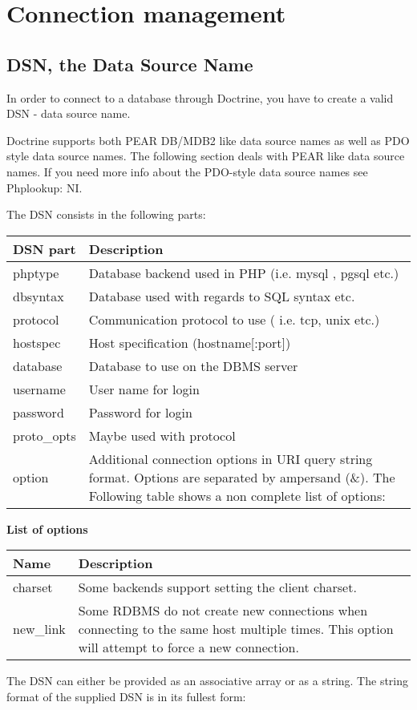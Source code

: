 \documentclass[11pt,a4paper]{report}
\begin{document}
\chapter{Connection management}
\section{DSN, the Data Source Name}
In order to connect to a database through Doctrine, you have to create a valid DSN - data source name.

Doctrine supports both PEAR DB/MDB2 like data source names as well as PDO style data source names. The following section deals with PEAR like data source names. If you need more info about the PDO-style data source names see Phplookup: NI.

The DSN consists in the following parts:

\begin{tabular}{|l|l|}
\hline
DSN part & Description\\
\hline
phptype & Database backend used in PHP (i.e. mysql , pgsql etc.)\\
\hline
dbsyntax & Database used with regards to SQL syntax etc.\\
\hline
protocol & Communication protocol to use ( i.e. tcp, unix etc.)\\
\hline
hostspec & Host specification (hostname[:port])\\
\hline
database & Database to use on the DBMS server\\
\hline
username & User name for login\\
\hline
password & Password for login\\
\hline
proto\_opts & Maybe used with protocol\\
\hline
option & Additional connection options in URI query string format. Options are separated by ampersand (\&). The Following table shows a non complete list of options:\\
\hline
\end{tabular}
\textbf{List of options}

\begin{tabular}{|l|l|}
\hline
Name & Description\\
\hline
charset & Some backends support setting the client charset.\\
\hline
new\_link & Some RDBMS do not create new connections when connecting to the same host multiple times. This option will attempt to force a new connection.\\
\hline
\end{tabular}
The DSN can either be provided as an associative array or as a string. The string format of the supplied DSN is in its fullest form:
\end{document}
